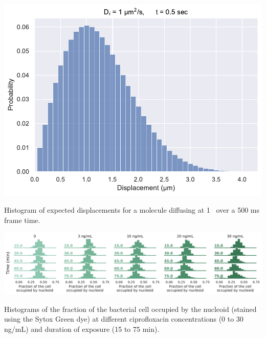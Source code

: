 \begin{suppfigure*}[htbp]
    \begin{center}
    \includegraphics[width=.8\textwidth]{SI_Figures/Displacements_distribution.pdf}
    \end{center}
    \caption{Histogram of expected displacements for a molecule diffusing at 1 \ums\ over a 500 ms frame time.}
    \label{SIFig:displacement_simul}
\end{suppfigure*}

\begin{suppfigure*}[htbp]
    \begin{center}
    \includegraphics[width=\textwidth]{SI_Figures/Nucleoid_compaction.pdf}
    \end{center}
    \caption{Histograms of the fraction of the bacterial cell occupied by the nucleoid (stained using the Sytox Green dye) at different ciprofloxacin concentrations (0 to 30 ng/mL) and duration of exposure (15 to 75 min).}
    \label{SIFig:nucleoid_compaction}
\end{suppfigure*}

